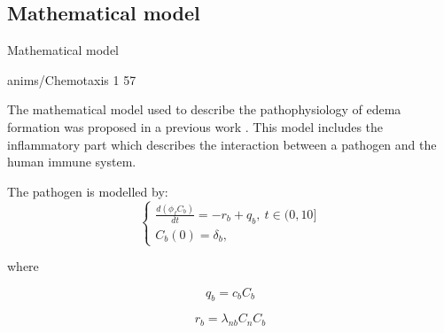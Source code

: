 \documentclass[serif,8pt, aspectratio=169]{beamer}
\begin{document}
\subsection{Mathematical model}
    \begin{frame}[fragile]{Mathematical model}
        \begin{minipage}{0.55\linewidth}
            \centering %
            {anims/Chemotaxis}%
            {1}%
            {57}%
        \end{minipage}
        \begin{minipage}{0.4\linewidth}
            The mathematical model used to describe the pathophysiology of edema formation was proposed in a previous work \cite{reis2019mathematical,reis2019personalized}. This model includes the inflammatory part which describes the interaction between a pathogen and the human immune system.
            
            The pathogen is modelled by:
            \begin{equation}
            \left\{\begin{matrix}
             \frac{d(\phi_fC_b)}{dt}=-r_b+q_b,~t\in(0,10]\\
             C_b(0) = \delta_b,
            \end{matrix}\right.
            \end{equation}

            where 
            
            \begin{equation}
                q_b = c_b C_b
            \end{equation}

            \begin{equation}
                r_b = \lambda_{nb}C_nC_b
            \end{equation}
        \end{minipage}
    \end{frame}
\end{document}

